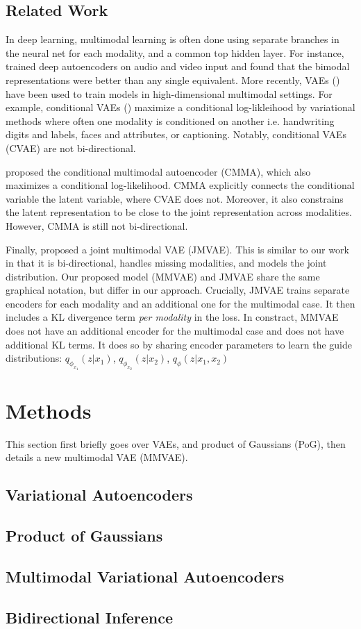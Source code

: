 \documentclass{article}
\begin{document}
\subsection{Related Work}
In deep learning, multimodal learning is often done using separate branches in the neural net for each modality, and a common top hidden layer. For instance, \citet{ngiam2011multimodal} trained deep autoencoders on audio and video input and found that the bimodal representations were better than any single equivalent. More recently, VAEs (\cite{kingma2013auto, kingma2014semi}) have been used to train models in high-dimensional multimodal settings. For example, conditional VAEs (\cite{sohn2015learning}) maximize a conditional log-likleihood by variational methods where often one modality is conditioned on another i.e. handwriting digits and labels, faces and attributes, or captioning. Notably, conditional VAEs (CVAE) are not bi-directional. 

\citet{pandey2017variational} proposed the conditional multimodal autoencoder (CMMA), which also maximizes a conditional log-likelihood. CMMA explicitly connects the conditional variable the latent variable, where CVAE does not. Moreover, it also constrains the latent representation to be close to the joint representation across modalities. However, CMMA is still not bi-directional.

Finally, \citet{suzuki2016joint} proposed a joint multimodal VAE (JMVAE). This is similar to our work in that it is bi-directional, handles missing modalities, and models the joint distribution. Our proposed model (MMVAE) and JMVAE share the same graphical notation, but differ in our approach. Crucially, JMVAE trains separate encoders for each modality and an additional one for the multimodal case. It then includes a KL divergence term \textit{per modality} in the loss. In constract, MMVAE does not have an additional encoder for the multimodal case and does not have additional KL terms. It does so by sharing encoder parameters to learn the guide distributions: $q_{\phi_{x_{1}}}(z|x_{1})$, $q_{\phi_{x_{2}}}(z|x_{2})$, $q_{\phi}(z|x_{1}, x_{2})$

\section{Methods}
This section first briefly goes over VAEs, and product of Gaussians (PoG), then details a new multimodal VAE (MMVAE).

\subsection{Variational Autoencoders}
\subsection{Product of Gaussians}
\subsection{Multimodal Variational Autoencoders}
\subsection{Bidirectional Inference}



{\small
\linespread{1}

}
\end{document}
